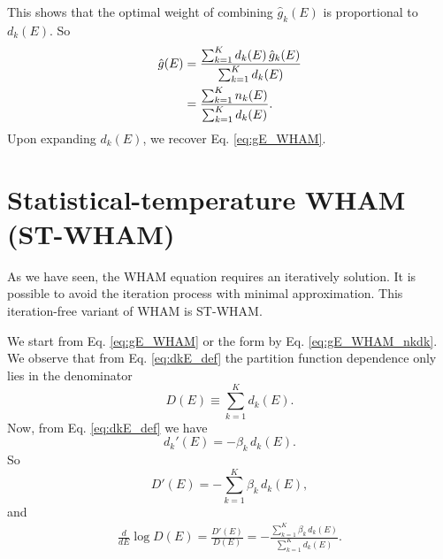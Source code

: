 \documentclass[aip,jcp,preprint,superscriptaddress]{revtex4-1}
\begin{document}
This shows that the optimal weight
of combining $\hat g_k(E)$ is proportional to $d_k(E)$.
%
So
\begin{align}
\hat g(E)
&=
\frac{ \sum_{k = 1}^K d_k(E) \, \hat g_k(E) }
     { \sum_{k = 1}^K d_k(E) }
\notag \\
&=
\frac{ \sum_{k = 1}^K n_k(E) }
     { \sum_{k = 1}^K d_k(E) }.
\label{eq:gE_WHAM_nkdk}
\end{align}
%
Upon expanding $d_k(E)$,
we recover Eq. \eqref{eq:gE_WHAM}.




\section{\label{sec:ST-WHAM}
Statistical-temperature WHAM (ST-WHAM)}



As we have seen,
the WHAM equation requires an iteratively solution.
%
It is possible to avoid the iteration process
with minimal approximation.
%
This iteration-free variant of WHAM
is ST-WHAM\cite{fenwick2008, kim2011}.



We start from Eq. \eqref{eq:gE_WHAM}
or the form by Eq. \eqref{eq:gE_WHAM_nkdk}.
%
We observe that from Eq. \eqref{eq:dkE_def}
the partition function
dependence only lies in the denominator
\[
D(E)
\equiv
\sum_{k = 1}^K d_k(E).
\]
Now, from Eq. \eqref{eq:dkE_def} we have
\[
d_k'(E)
= -\beta_k \, d_k(E).
\]
So
\[
D'(E)
= -\sum_{k = 1}^K \beta_k \, d_k(E),
\]
and
\begin{align}
\frac{d}{dE} \log D(E)
=
\frac{ D'(E) } { D(E) }
=
-\frac{ \sum_{k = 1}^K \beta_k \, d_k(E) }
      { \sum_{k = 1}^K d_k(E) }.
\label{eq:dlogD_step1}
\end{align}
\end{document}
